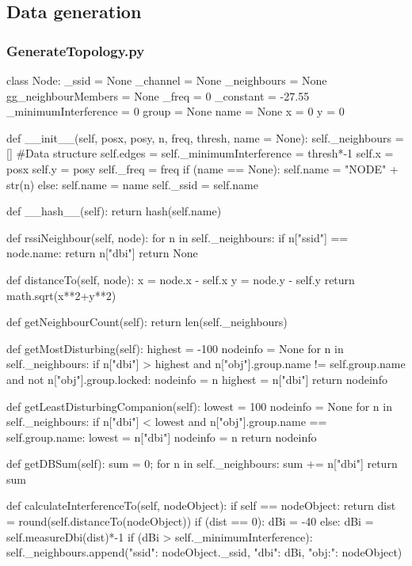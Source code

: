 \begin{appendices}
\chapter{Data generation}
\subsection{GenerateTopology.py}
\begin{python}

class Node:
	_ssid = None
	_channel = None
	_neighbours = None
	gg_neighbourMembers = None
	_freq = 0
	_constant  = -27.55
	_minimumInterference = 0
	group = None
	name = None
	x = 0
	y = 0

	def __init__(self, posx, posy, n, freq, thresh, name = None):
		self._neighbours = []
		#Data structure 
		self.edges = {}
		self._minimumInterference = thresh*-1
		self.x = posx
		self.y = posy
		self._freq = freq
		if (name == None):
			self.name = "NODE" + str(n)
		else:
			self.name = name
		self._ssid = self.name

	def __hash__(self):
		return hash(self.name)

	def rssiNeighbour(self, node):
		for n in self._neighbours:
			if n["ssid"] == node.name:
			return n["dbi"]
		return None

	def distanceTo(self, node):
		x = node.x - self.x
		y = node.y - self.y
		return math.sqrt(x**2+y**2)

	def getNeighbourCount(self):
		return len(self._neighbours)

	def getMostDisturbing(self):
		highest = -100
		nodeinfo = None
		for n in self._neighbours:
			if n["dbi"] > highest and n["obj"].group.name != self.group.name and not n["obj"].group.locked:
			nodeinfo = n
			highest = n["dbi"]
		return nodeinfo

	def getLeastDisturbingCompanion(self):
		lowest = 100
		nodeinfo = None
		for n in self._neighbours:
			if n["dbi"] < lowest and n["obj"].group.name == self.group.name:
			lowest = n["dbi"]
			nodeinfo = n
		return nodeinfo

	def getDBSum(self):
		sum = 0;
		for n in self._neighbours:
			sum += n["dbi"]
		return sum

	def calculateInterferenceTo(self, nodeObject):
		if self == nodeObject:
			return
		dist = round(self.distanceTo(nodeObject))
		if (dist == 0):
			dBi = -40
		else:
			dBi  = self.measureDbi(dist)*-1
		if (dBi > self._minimumInterference):
			self._neighbours.append({"ssid": nodeObject._ssid, "dbi": dBi, "obj:": nodeObject})


\end{python}
\end{appendices}
